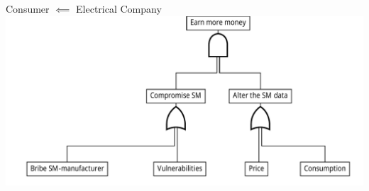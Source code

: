 \begin{frame}{Consumer $\impliedby$ Electrical Company}
\includegraphics[width=\textwidth]{graphics/electrical_company_vs_consumer.pdf}

\end{frame}

